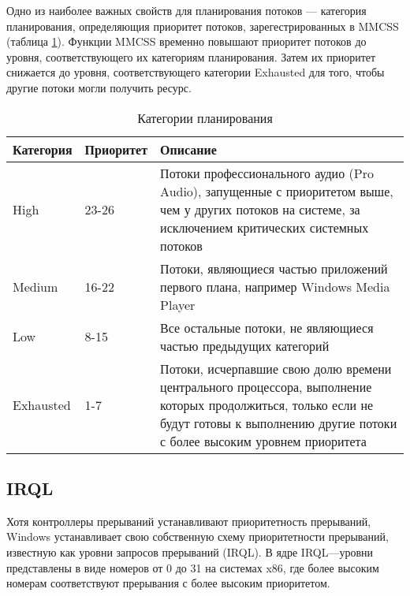 Одно из наиболее важных свойств для планирования потоков --- категория планирования, определяющия приоритет потоков, зарегестрированных в MMCSS (таблица \ref{tbl:category}). Функции MMCSS временно повышают приоритет потоков до уровня, соответствующего их категориям планирования. Затем их приоритет снижается до уровня, соответствующего категории Exhausted для того, чтобы другие потоки могли получить ресурс.

\FloatBarrier
\begin{table}[h]
	\begin{center}
        \begin{threeparttable} \captionsetup{justification=raggedright,singlelinecheck=off}
		\caption{\label{tbl:category} Категории планирования}
		\begin{tabular}{|p{40mm}|p{30mm}|p{80mm}|}
            \hline
            \textbf{Категория} & \textbf{Приоритет} & \textbf{Описание} \\
            \hline
            High & 23-26 & Потоки профессионального аудио (Pro
Audio), запущенные с приоритетом выше, чем у других потоков на системе, за
исключением критических системных потоков \\
            \hline
            Medium & 16-22 & Потоки, являющиеся частью приложений
первого плана, например Windows Media Player \\
            \hline
            Low & 8-15 & Все остальные потоки, не являющиеся частью
предыдущих категорий \\
            \hline
            Exhausted & 1-7 & Потоки, исчерпавшие свою
долю времени центрального процессора, выполнение которых продолжиться, только
если не будут готовы к выполнению другие потоки с более высоким уровнем
приоритета \\
            \hline
		\end{tabular}
        \end{threeparttable}
	\end{center}
\end{table}
\FloatBarrier


\subsection{IRQL}

Хотя контроллеры прерываний устанавливают приоритетность прерываний,
Windows устанавливает свою собственную схему приоритетности прерываний, известную как уровни запросов прерываний (IRQL). В ядре IRQL---уровни представлены в виде номеров от 0 до 31 на системах x86, где более высоким номерам соответствуют прерывания с более высоким приоритетом.

